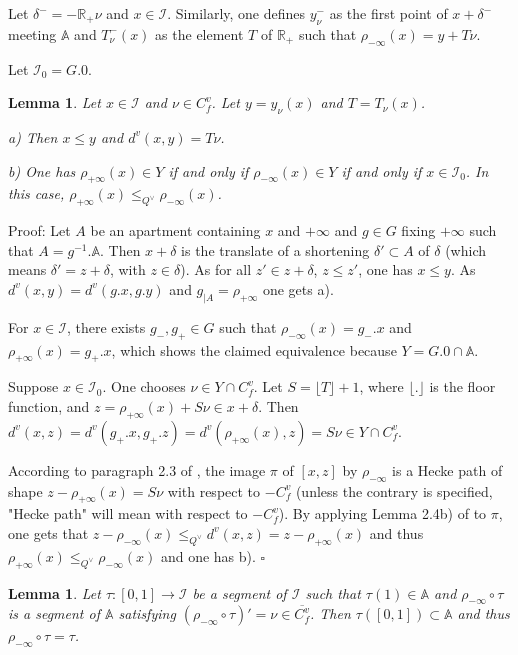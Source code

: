 \documentclass[12pt]{article}
\theoremstyle{plain}
\newtheorem{lemme}[thm]{Lemma}
\theoremstyle{definition}
\newcommand{\R}{\mathbb{R}}
\newcommand{\A}{\mathbb{A}}
\newcommand{\I}{\mathcal{I}}
\begin{document}
Let $\delta^-=-\R_+\nu$ and $x\in \I$. Similarly, one defines $y_\nu^-$ as the first point of $x+\delta^-$ meeting $\A$ and $T^-_\nu(x)$ as the element $T$ of $\R_+$ such that $\rho_{-\infty}(x)=y+T\nu$.



Let $\I_0=G.0$.


\begin{lemme}\label{lemme distance vectorielle}
Let $x\in \mathcal{I}$ and $\nu\in C_f^v$. Let $y=y_\nu(x)$ and $T=T_\nu(x)$.

a)  Then $x\leq y$ and $d^v(x,y)=T\nu$.

b) One has $\rho_{+\infty}(x)\in Y$ if and only if $\rho_{-\infty}(x)\in Y$ if and only if $x\in \mathcal I_0$. In this case, $\rho_{+\infty}(x)\leq_{Q^\vee} \rho_{-\infty}(x)$.


\end{lemme}

Proof: Let $A$ be an apartment containing $x$ and $+\infty$ and $g\in G$ fixing $+\infty$ such that $A=g^{-1}.\A$. Then $x+\delta$ is the translate of a shortening $\delta'\subset A$ of $\delta$ (which means $\delta'=z+\delta$, with $z\in \delta$). As for all $z'\in z+\delta$, $z\leq z'$, one has $x\leq y$. As $d^v(x,y)=d^v(g.x,g.y)$ and $g_{|A}=\rho_{+\infty}$ one gets a).

For $x\in\mathcal{I}$, there exists $g_-,g_+\in G$ such that $\rho_{-\infty}(x)=g_-.x$ and $\rho_{+\infty}(x)=g_+.x$, which shows the claimed equivalence because $Y=G.0\cap \mathbb{A}$.

Suppose $x\in \mathcal{I}_0$. One chooses $\nu\in Y\cap C_f^v$. Let $S=\lfloor T\rfloor +1$, where $\lfloor.\rfloor$ is the floor function, and $z=\rho_{+\infty}(x)+S\nu\in x+\delta$. Then $d^v(x,z)=d^v(g_+.x,g_+.z)=d^v(\rho_{+\infty}(x),z)=S\nu\in Y\cap C^v_f$.

According to paragraph 2.3 of \cite{gaussent2014spherical}, the image $\pi$ of $[x,z]$ by $\rho_{-\infty}$ is a Hecke path of shape $z-\rho_{+\infty}(x)=S\nu$ with respect to $-C^v_f$ (unless the contrary is specified, "Hecke path" will mean with respect to $-C^v_f$). By applying Lemma 2.4b) of \cite{gaussent2014spherical} to $\pi$, one gets that $z-\rho_{-\infty}(x)\leq _{Q^\vee} d^v(x,z)=z-\rho_{+\infty}(x)$ and thus $\rho_{+\infty}(x)\leq_{Q^\vee} \rho_{-\infty}(x)$ and one has b). $\square$


\begin{lemme}\label{lemme image réciproque de segments}
Let $\tau:[0,1]\rightarrow \mathcal{I}$ be a segment of $\mathcal{I}$ such that $\tau(1)\in \mathbb{A}$ and $\rho_{-\infty}\circ\tau$ is a segment of $\mathbb{A}$ satisfying  $(\rho_{-\infty}\circ\tau)'=\nu\in \overline{C^v_f}$. Then $\tau([0,1])\subset \mathbb{A}$ and thus $\rho_{-\infty}\circ \tau=\tau$.
\end{lemme}
\end{document}
